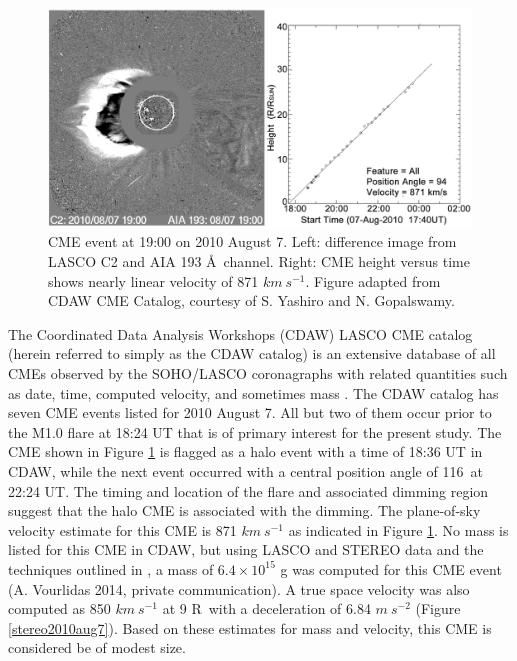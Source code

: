 \begin{figure}[!h]
    \begin{center}
	    \includegraphics[width=150mm]{Images/Lasco2010Aug7Cme.png}
    \end{center}
    \caption[LASCO coronagraph data for 2010 August 7 event]{
        CME event at 19:00 on 2010 August 7. Left: difference image from LASCO C2 and AIA 193 \AA\ channel. 
        Right: CME height versus time shows nearly linear velocity of 871 $km\ s^{-1}$. 
        Figure adapted from CDAW CME Catalog, courtesy of S. Yashiro and N. Gopalswamy.
	}
    \label{lasco2010aug7}
\end{figure}

The Coordinated Data Analysis Workshops (CDAW) LASCO CME catalog (herein referred to simply as the CDAW catalog) is an extensive database of all CMEs observed by the SOHO/LASCO coronagraphs with related quantities such as date, time, computed velocity, and sometimes mass \citep{Gopalswamy2009}. The CDAW catalog has seven CME events listed for 2010 August 7. All but two of them occur prior to the M1.0 flare at 18:24 UT that is of primary interest for the present study. The CME shown in Figure \ref{lasco2010aug7} is flagged as a halo event with a time of 18:36 UT in CDAW, while the next event occurred with a central position angle of 116\degree\ at 22:24 UT. The timing and location of the flare and associated dimming region suggest that the halo CME is associated with the dimming. The plane-of-sky velocity estimate for this CME is 871 $km\ s^{-1}$ as indicated in Figure \ref{lasco2010aug7}. No mass is listed for this CME in CDAW, but using LASCO and STEREO data and the techniques outlined in \citet{Colaninno2009}, a mass of $6.4 \times 10^{15}$ g was computed for this CME event (A. Vourlidas 2014, private communication). A true space velocity was also computed as 850 $km\ s^{-1}$ at 9 R\astrosun\ with a deceleration of 6.84 $m\ s^{-2}$ (Figure \ref{stereo2010aug7}). Based on these estimates for mass and velocity, this CME is
considered be of modest size.

